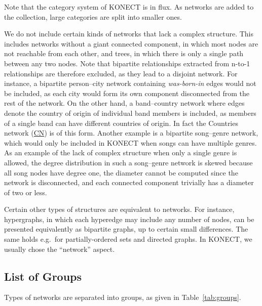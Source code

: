 \documentclass{article}
\begin{document}
Note that the category system of KONECT is in flux.  As networks are
added to the collection, large categories are split into smaller ones. 

We do not include certain kinds of networks that lack a complex
structure. This includes networks without a giant connected component,
in which most nodes are not reachable from each other, and trees, in
which there is only a single path between any two nodes.  Note that
bipartite relationships extracted from n-to-1 relationships are
therefore excluded, as they lead to a disjoint network. For instance, a
bipartite person--city network containing \emph{was-born-in} edges would
not be included, as each city would form its own component disconnected
from the rest of the network.  On the other hand, a band--country
network where edges denote the country of origin of individual band
members is included, as members of a single band can have different
countries of origin. In fact the Countries network
(\href{http://konect.uni-koblenz.de/networks/dbpedia-country}{\textsf{CN}})
is of this form.  Another example is a bipartite song--genre network,
which would only be included in KONECT when songs can have multiple
genres.  As an example of the lack of complex structure when only a
single genre is allowed, the degree distribution in such a song--genre
network is skewed because all song nodes have degree one, the diameter
cannot be computed since the network is disconnected, and each connected
component trivially has a diameter of two or less.

Certain other types of structures are equivalent to networks.  For
instance, hypergraphs, in which each hyperedge may include any number of
nodes, can be presented equivalently as bipartite graphs, up to certain
small differences.  The same holds e.g.\ for partially-ordered sets and
directed graphs.  In KONECT, we usually chose the ``network'' aspect. 

\subsection{List of Groups}
\label{sec:groups}
Types of networks are separated into groups, as given in
Table~\ref{tab:groups}. 
\end{document}
